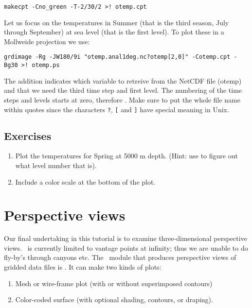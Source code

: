 \documentclass{report}
\begin{document}
\begin{verbatim}
makecpt -Cno_green -T-2/30/2 >! otemp.cpt
\end{verbatim}

Let us focus on the temperatures in Summer (that is the third season, July through
September) at sea level (that is the first level). To plot these in a Mollweide projection we
use:

\begin{verbatim}
grdimage -Rg -JW180/9i "otemp.anal1deg.nc?otemp[2,0]" -Cotemp.cpt -Bg30 >! otemp.ps
\end{verbatim}

The addition  indicates which variable to retreive from the NetCDF
file (otemp) and that we need the third time step and first level. The numbering of the
time steps and levels starts at zero, therefore \filename{[2,0]}. Make sure to put the
whole file name within quotes since the characters \verb|?|, \verb|[| and \verb|]| have
special meaning in Unix.

\subsection{Exercises}

\begin{enumerate}

\item Plot the temperatures for Spring at 5000 m depth. (Hint: use  to
figure out what level number that is).

\item Include a color scale at the bottom of the plot.

\end{enumerate}

\section{Perspective views}

Our final undertaking in this tutorial is to examine three-dimensional
perspective views.  \GMT\ is currently limited to vantage points at
infinity; thus we are unable to do fly-by's through canyons etc.  The
\GMT\ module that produces perspective views of gridded data files is
.  It can make two kinds of plots:

\begin{enumerate}

\item Mesh or wire-frame plot (with or without superimposed contours)

\item Color-coded surface (with optional shading, contours, or draping).

\end{enumerate}
\end{document}
